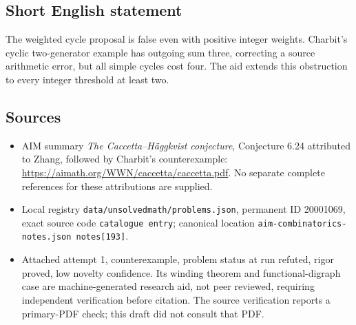 \documentclass[11pt]{article}
\begin{document}
\subsection{Short English statement}
The weighted cycle proposal is false even with positive integer weights. Charbit's cyclic two-generator example has outgoing sum three, correcting a source arithmetic error, but all simple cycles cost four. The aid extends this obstruction to every integer threshold at least two.
\subsection{Sources}
\begin{itemize}
\item AIM summary \emph{The Caccetta--H\"aggkvist conjecture}, Conjecture 6.24 attributed to Zhang, followed by Charbit's counterexample: \url{https://aimath.org/WWN/caccetta/caccetta.pdf}. No separate complete references for these attributions are supplied.
\item Local registry \texttt{data/unsolvedmath/problems.json}, permanent ID 20001069, exact source code \texttt{catalogue entry}; canonical location \texttt{aim-combinatorics-notes.json notes[193]}.
\item Attached attempt 1, counterexample, problem status at run refuted, rigor proved, low novelty confidence. Its winding theorem and functional-digraph case are machine-generated research aid, not peer reviewed, requiring independent verification before citation. The source verification reports a primary-PDF check; this draft did not consult that PDF.
\end{itemize}
\end{document}
